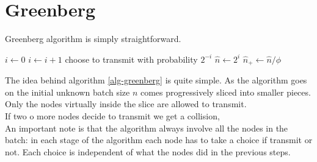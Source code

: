 \documentclass[12pt,a4paper,twocolumns]{report}
\newcommand{\algname}[1]{\ensuremath{\mbox{\sc #1}}}
\begin{document}
\section{Greenberg}

Greenberg algorithm is simply straightforward.

\begin{algorithm}[H]
\begin{algorithmic}
\STATE $i\gets 0$
\REPEAT
	\STATE $i\gets i+1$
	\STATE choose to transmit with probability $2^{-i}$
\STATE $\hat{n} \gets 2^{i}$
\STATE $\hat{n}_{+} \gets \hat{n}/\phi$
\end{algorithmic}
\caption{\algname{Greenberg}}
\label{alg-greenberg}
\end{algorithm}

The idea behind algorithm \ref{alg-greenberg} is quite simple. As the algorithm goes on the initial unknown batch size $n$
comes progressively sliced into smaller pieces. Only the nodes virtually inside the slice are allowed to transmit.\\
If two o more nodes decide to transmit we get a collision,\\
An important note is that the algorithm always involve all the nodes in the batch: in each stage of the algorithm each node has to take a choice if transmit or not. 
Each choice is independent of what the nodes did in the previous steps.\\
\end{document}
